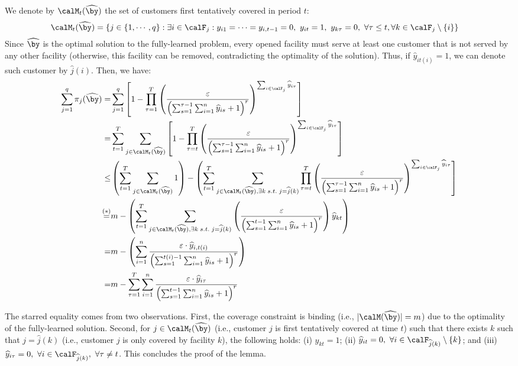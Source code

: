 \documentclass[blindrev]{informs3noheader}
\begin{document}
We denote by $\calM_t(\widehat{\by})$ the set of customers first tentatively covered in period $t$:
\begin{align*}
\calM_t(\widehat{\by})&=\left\{j\in\{1,\cdots,q\}:\exists i\in\calF_j:y_{i1}=\cdots=y_{i,t-1}=0,\ y_{it}=1,\ y_{k\tau}=0,\ \forall \tau\leq t,\forall k\in\calF_j\setminus\{i\}\right\}
\end{align*}
Since $\widehat{\by}$ is the optimal solution to the fully-learned problem, every opened facility must serve at least one customer that is not served by any other facility (otherwise, this facility can be removed, contradicting the optimality of the solution). Thus, if $\widehat{y}_{it(i)}=1$, we can denote such customer by $\widehat{j}(i)$. Then, we have:
\begin{align*}
\sum_{j=1}^q \pi_{j}(\widehat{\by})
=&\sum_{j=1}^q\left[1-\prod_{\tau=1}^T \left(\frac{\varepsilon}{\left(\sum_{s=1}^{\tau-1}\sum_{i=1}^n \widehat{y}_{is}+1\right)^r}\right)^{\sum_{i \in \calF_j} \widehat{y}_{i\tau}}\right]\\
=&\sum_{t=1}^T\sum_{j \in \calM_t(\widehat{\by})} \left[1-\prod_{\tau=t}^T \left(\frac{\varepsilon}{\left(\sum_{s=1}^{\tau-1}\sum_{i=1}^n \widehat{y}_{is}+1\right)^r}\right)^{\sum_{i \in \calF_j} \widehat{y}_{i\tau}}\right]\\
\leq &\left(\sum_{t=1}^T\sum_{j \in \calM_t(\widehat{\by})} 1\right)-\left(\sum_{t=1}^T\sum_{j \in \calM_t(\widehat{\by}), \exists k\;s.t.\;j=\widehat{j}(k)}\prod_{\tau=t}^T \left(\frac{\varepsilon}{\left(\sum_{s=1}^{\tau-1}\sum_{i=1}^n \widehat{y}_{is}+1\right)^r}\right)^{\sum_{i \in \calF_j} \widehat{y}_{i\tau}}\right]\\
\overset{{(*)}}{=}& m-\left(\sum_{t=1}^T\sum_{j \in \calM_t(\widehat{\by}), \exists k\;s.t.\;j=\widehat{j}(k)} \left(\frac{\varepsilon}{\left(\sum_{s=1}^{t-1}\sum_{i=1}^n \widehat{y}_{is}+1\right)^r}\right)\widehat{y}_{kt}\right)\\
=&m-\left(\sum_{i=1}^n \frac{\varepsilon\cdot \widehat{y}_{i,t(i)}}{\left(\sum_{s=1}^{t(i)-1}\sum_{i=1}^n \widehat{y}_{is}+1\right)^r}\right)\\
=&m-\sum_{\tau=1}^T\sum_{i=1}^n\frac{\varepsilon\cdot \widehat{y}_{i\tau}}{\left(\sum_{s=1}^{t-1}\sum_{i=1}^n \widehat{y}_{is}+1\right)^r}
\end{align*}

The starred equality comes from two observations. First, the coverage constraint is binding (i.e., $|\calM(\widehat{\by})|=m$) due to the optimality of the fully-learned solution. Second, for $j\in \calM_t(\widehat{\by})$ (i.e., customer $j$ is first tentatively covered at time $t$) such that there exists $k$ such that $j=\widehat{j}(k)$ (i.e., customer $j$ is only covered by facility $k$), the following holds: (i) $\widehat{y}_{kt}=1$; (ii) $\widehat{y}_{it} =0,\ \forall i\in\calF_{\widehat{j}(k)}\setminus\{k\}$; and (iii) $\widehat{y}_{i\tau} =0,\ \forall i\in\calF_{\widehat{j}(k)},\ \forall \tau\neq t$. This concludes the proof of the lemma.
\hfill\Halmos
\end{document}
